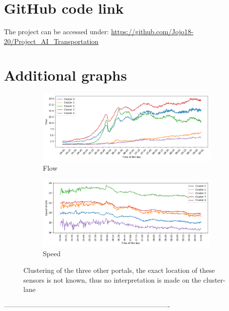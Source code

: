 	
	\appendix
	
	\section{GitHub code link}
	The project can be accessed under:
	\url{https://github.com/Jojo18-20/Project_AI_Transportation}
	
	\section{Additional graphs}
	\begin{figure}[H]
		\centering
		\begin{subfigure}{0.9 \linewidth}
			\includegraphics[width=\textwidth]{../Plots/Flow/clustering_3portals}
			\caption{Flow}
		\end{subfigure}
		\begin{subfigure}{0.9 \linewidth}
			\includegraphics[width=\textwidth]{../Plots/Speed/clustering_3portals}
			\caption{Speed}
		\end{subfigure}
		\caption{Clustering of the three other portals, the exact location of these sensors is not known, thus no interpretation is made on the cluster-lane }
		\label{fig:clustering_3portals}
	\end{figure}
	-------------------------------------------------------------------------%
	
